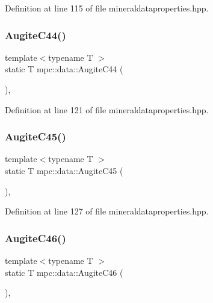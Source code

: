 Definition at line 115 of file mineraldataproperties.\+hpp.

\mbox{\label{namespacempc_1_1data_a63404b2605c4917b00ae328f754a6752}} 
\subsubsection{\texorpdfstring{Augite\+C44()}{AugiteC44()}}
{\footnotesize\ttfamily template$<$typename T $>$ \\
static T mpc\+::data\+::\+Augite\+C44 (\begin{DoxyParamCaption}{ }\end{DoxyParamCaption})\hspace{0.3cm}{\ttfamily [inline]}, {\ttfamily [static]}}



Definition at line 121 of file mineraldataproperties.\+hpp.

\mbox{\label{namespacempc_1_1data_a4ca932db778c26d988634f2b04176813}} 
\subsubsection{\texorpdfstring{Augite\+C45()}{AugiteC45()}}
{\footnotesize\ttfamily template$<$typename T $>$ \\
static T mpc\+::data\+::\+Augite\+C45 (\begin{DoxyParamCaption}{ }\end{DoxyParamCaption})\hspace{0.3cm}{\ttfamily [inline]}, {\ttfamily [static]}}



Definition at line 127 of file mineraldataproperties.\+hpp.

\mbox{\label{namespacempc_1_1data_ae4bad6f0493690a3ec7c8f1f196f2dee}} 
\subsubsection{\texorpdfstring{Augite\+C46()}{AugiteC46()}}
{\footnotesize\ttfamily template$<$typename T $>$ \\
static T mpc\+::data\+::\+Augite\+C46 (\begin{DoxyParamCaption}{ }\end{DoxyParamCaption})\hspace{0.3cm}{\ttfamily [inline]}, {\ttfamily [static]}}



